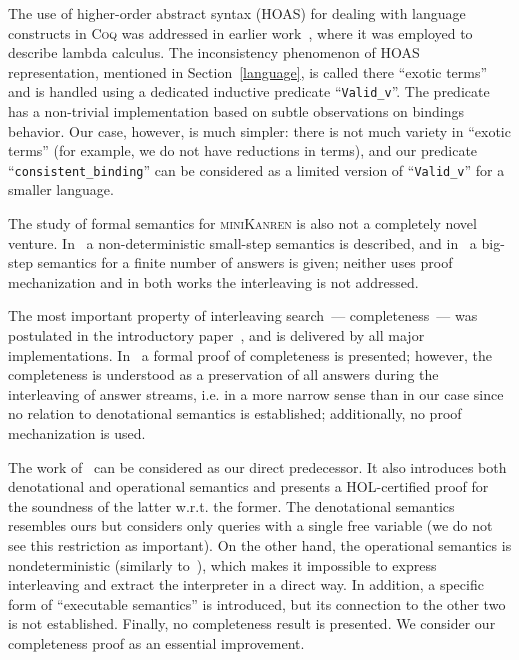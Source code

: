 The use of higher-order abstract syntax (HOAS) for dealing with language constructs in \textsc{Coq} was addressed in earlier work~\cite{HOASinCoq},
where it was employed to describe lambda calculus. The inconsistency phenomenon of HOAS representation, mentioned in Section~\ref{language}, is called
there ``exotic terms'' and is handled using a dedicated inductive predicate ``\lstinline|Valid_v|''. The predicate has a non-trivial implementation based
on subtle observations on bindings behavior. Our case, however, is much simpler: there is not much variety in ``exotic terms'' (for example, we do not have
reductions in terms), and our predicate ``\lstinline|consistent_binding|'' can be considered as a limited version of ``\lstinline|Valid_v|'' for a
smaller language.

The study of formal semantics for \textsc{miniKanren} is also not a completely novel venture. In~\cite{RelConversion} a non-deterministic
small-step semantics is described, and in~\cite{DivTest} a big-step semantics for a finite number of answers is given;
neither uses proof mechanization and in both works the interleaving is not addressed. 

The most important property of interleaving search~--- completeness~--- was postulated in the introductory paper~\cite{Search}, and is delivered by
all major implementations. In~\cite{2016} a formal proof of completeness is presented; however, the completeness is understood as a
preservation of all answers during the interleaving of answer streams, i.e. in a more narrow sense than in our case since no relation
to denotational semantics is established; additionally, no proof mechanization is used.

The work of~\cite{MechanisingMiniKanren} can be considered as our direct predecessor. It also introduces both denotational and
operational semantics and presents a \textsc{HOL}-certified proof for the soundness of the latter w.r.t. the former. The denotational
semantics resembles ours but considers only queries with a single free variable (we do not see this restriction as important).
On the other hand, the operational semantics is nondeterministic (similarly to~\cite{RelConversion}), which makes it
impossible to express interleaving and extract the interpreter in a direct way. In addition, a specific form of ``executable semantics''
is introduced, but its connection to the other two is not established. Finally, no completeness result is presented.
We consider our completeness proof as an essential improvement. 
